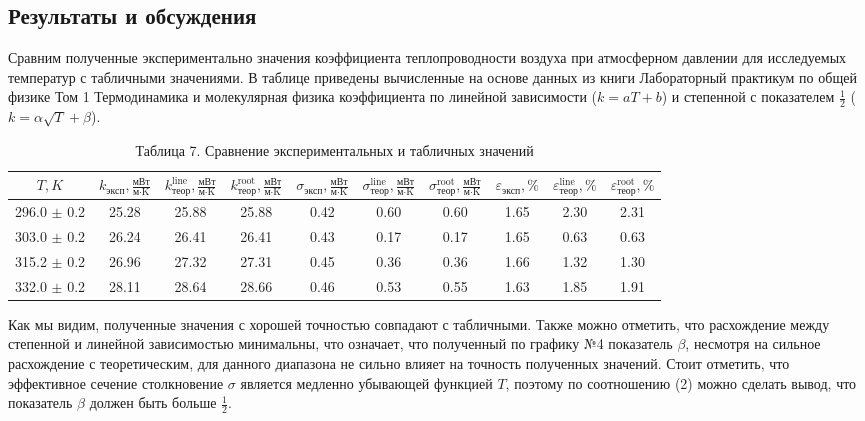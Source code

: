 \documentclass[a4paper]{article}
\begin{document}
\begin{enumerate}
\section{Результаты и обсуждения}
Сравним полученные экспериментально значения коэффициента теплопроводности воздуха при атмосферном давлении для исследуемых температур с табличными значениями. В таблице приведены вычисленные на основе данных из книги Лабораторный практикум по общей физике Том 1 Термодинамика и молекулярная физика коэффициента по линейной зависимости ($k = aT + b$) и степенной с показателем $\frac{1}{2}$ ($k = \alpha \sqrt{T} + \beta$).
\begin{table}[h!]
    \centering
    \begin{tabular}{|*{10}{c|}}
	\hline
        $T, K$ & $k_\text{эксп}, \frac{\text{мВт}}{\text{м} \cdot \text{K}}$ & $k_{\text{теор}}^{\text{line}}, \frac{\text{мВт}}{\text{м} \cdot \text{K}}$ & $k_{\text{теор}}^{\text{root}}, \frac{\text{мВт}}{\text{м} \cdot \text{K}}$ & $\sigma_{\text{эксп}}, \frac{\text{мВт}}{\text{м} \cdot \text{K}}$ & $\sigma_{\text{теор}}^{\text{line}}, \frac{\text{мВт}}{\text{м} \cdot \text{K}}$ & $\sigma_{\text{теор}}^{\text{root}}, \frac{\text{мВт}}{\text{м} \cdot \text{K}}$ & $\varepsilon_{\text{эксп}}, \%$ & $\varepsilon_{\text{теор}}^{\text{line}}, \%$ & $\varepsilon_{\text{теор}}^{\text{root}}, \%$ \\ \hline
        296.0 $\pm$ 0.2  & 25.28 & 25.88 & 25.88 & 0.42 & 0.60 & 0.60 & 1.65 & 2.30 & 2.31 \\ \hline
        303.0 $\pm$ 0.2  & 26.24 & 26.41 & 26.41 & 0.43 & 0.17 & 0.17 & 1.65 & 0.63 & 0.63 \\ \hline
        315.2 $\pm$ 0.2 & 26.96 & 27.32 & 27.31 & 0.45 & 0.36 & 0.36 & 1.66 & 1.32 & 1.30 \\ \hline
        332.0 $\pm$ 0.2 & 28.11 & 28.64 & 28.66 & 0.46 & 0.53 & 0.55 & 1.63 & 1.85 & 1.91 \\ \hline
    \end{tabular}
    \caption{Таблица 7. Сравнение экспериментальных и табличных значений}
\end{table}

Как мы видим, полученные значения с хорошей точностью совпадают с табличными. Также можно отметить, что расхождение между степенной и линейной зависимостью минимальны, что означает, что полученный по графику №4 показатель $\beta$, несмотря на сильное расхождение с теоретическим, для данного диапазона не сильно влияет на точность полученных значений. Стоит отметить, что эффективное сечение столкновение $\sigma$ является медленно убывающей функцией $T$, поэтому по соотношению (2) можно сделать вывод, что показатель $\beta$ должен быть больше $\frac{1}{2}$.

\end{enumerate}
\end{document}
